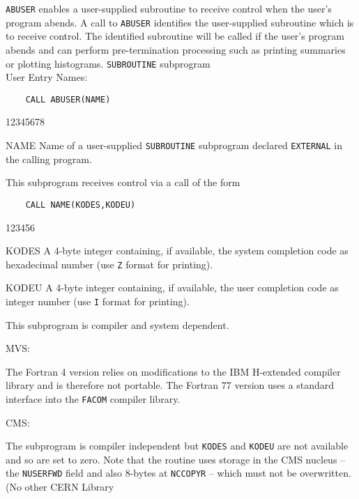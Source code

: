                           
           
\Submitter{}                              
                      
{\tt ABUSER} enables a user-supplied subroutine to receive control when
the user's program abends. A call to {\tt ABUSER} identifies the
user-supplied subroutine which is to receive control. The
identified subroutine will be called if the user's program
abends and can perform pre-termination processing such as
printing summaries or plotting histograms.
\Structure
{\tt SUBROUTINE} subprogram \\
User Entry Names: 
\Usage
\begin{verbatim}
    CALL ABUSER(NAME)
\end{verbatim}
\begin{DLtt}{12345678}
\item [NAME] Name of a user-supplied {\tt SUBROUTINE} subprogram
declared {\tt EXTERNAL} in the calling program.
\end{DLtt}
This subprogram
receives control via a call of the form
\begin{verbatim}
    CALL NAME(KODES,KODEU)
\end{verbatim}
\begin{DLtt}{123456}
\item[KODES] A 4-byte integer containing, if available, the system
completion code as hexadecimal number (use {\tt Z} format for printing).
\item[KODEU] A 4-byte integer containing, if available, the user
completion code as integer number (use {\tt I} format for printing).
\end{DLtt}
\Restrict
This subprogram is compiler and system dependent.
\par
MVS:
\par
The Fortran 4 version relies on modifications to the IBM
H-extended compiler  library and is therefore not portable. The
Fortran 77 version uses a standard interface into the {\tt FACOM}
compiler library.
\par
CMS:
\par
The subprogram is compiler independent but {\tt KODES} and {\tt KODEU}
are not available and so are set to zero. Note that the routine uses
storage in the CMS nucleus -- the {\tt NUSERFWD} field and also 8-bytes
at {\tt NCCOPYR} -- which must not be overwritten. (No other CERN Library
